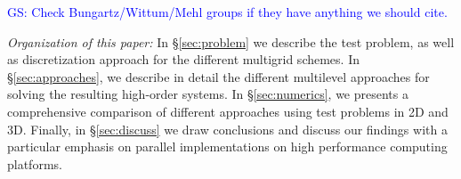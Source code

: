 \documentclass[smallcondensed,final]{svjour3}     %
\newcommand{\gsnote}[1]{\textcolor{blue}{GS: #1}}
\begin{document}
\gsnote{Check Bungartz/Wittum/Mehl groups if they have anything we should cite.}

{\em Organization of this paper:} In \S\ref{sec:problem} we describe
the test problem, as well as discretization approach for the different
multigrid schemes. In \S\ref{sec:approaches}, we describe in detail
the different multilevel approaches for solving the resulting
high-order systems. In \S\ref{sec:numerics}, we presents a
comprehensive comparison of different approaches using test problems
in 2D and 3D. Finally, in \S\ref{sec:discuss} we draw conclusions and
discuss our findings with a particular emphasis on parallel
implementations on high performance computing platforms.







\end{document}
